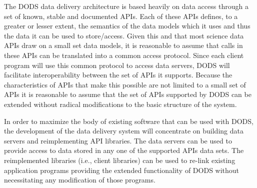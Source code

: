 The DODS data delivery architecture is based heavily on data access through a
set of known, stable and documented APIs. Each of these APIs defines, to a
greater or lesser extent, the semantics of the data models which it uses and
thus the data it can be used to store/access. Given this and that most
science data APIs draw on a small set data models, it is reasonable to assume
that calls in these APIs can be translated into a common access protocol.
Since each client program will use this common protocol to access data
servers, DODS will facilitate interoperability between the set of APIs it
supports. Because the characteristics of APIs that make this possible are not
limited to a small set of APIs it is reasonable to assume that the set of
APIs supported by DODS can be extended without radical modifications to the
basic structure of the system.

In order to maximize the body of existing software that can be used with
DODS, the development of the data delivery system will concentrate on
building data servers and reimplementing API libraries. The data servers can
be used to provide access to data stored in any one of the supported APIs
data sets. The reimplemented libraries (i.e., client libraries) can be used
to re-link existing application programs providing the extended functionality
of DODS without necessitating any modification of those programs.





